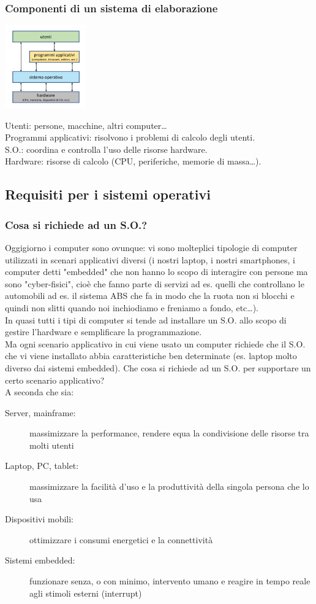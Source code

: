 \subsubsection{Componenti di un sistema di elaborazione}
\begin{center}
    \includegraphics[width=35mm]{images/SO/SO_sistema_di_elaborazione1.jpg}
\end{center}
Utenti: persone, macchine, altri computer\dots\\
Programmi applicativi: risolvono i problemi di calcolo degli utenti.\\
S.O.: coordina e controlla l'uso delle risorse hardware.\\
Hardware: risorse di calcolo (CPU, periferiche, memorie di massa\dots).

\subsection{Requisiti per i sistemi operativi}
\subsubsection{Cosa si richiede ad un S.O.?}
Oggigiorno i computer sono ovunque: vi sono molteplici tipologie di computer utilizzati in scenari applicativi diversi (i nostri laptop, i nostri smartphones, i computer detti "embedded" che non hanno lo scopo di interagire con persone ma sono "cyber-fisici", cioè che fanno parte di servizi ad es. quelli che controllano le automobili ad es. il sistema ABS che fa in modo che la ruota non si blocchi e quindi non slitti quando noi inchiodiamo e freniamo a fondo, etc\dots).\\
In quasi tutti i tipi di computer si tende ad installare un S.O. allo scopo di gestire l'hardware e semplificare la programmazione.\\
Ma ogni scenario applicativo in cui viene usato un computer richiede che il S.O. che vi viene installato abbia caratteristiche ben determinate (es. laptop molto diverso dai sistemi embedded). Che cosa si richiede ad un S.O. per supportare un certo scenario applicativo?\\
A seconda che sia: 
\begin{description}
    \item[Server, mainframe:] massimizzare la performance, rendere equa la condivisione delle risorse tra molti utenti
    \item[Laptop, PC, tablet:] massimizzare la facilità d'uso e la produttività della singola persona che lo usa
    \item[Dispositivi mobili:] ottimizzare i consumi energetici e la connettività
    \item[Sistemi embedded:] funzionare senza, o con minimo, intervento umano e reagire in tempo reale agli stimoli esterni (interrupt)
\end{description}
